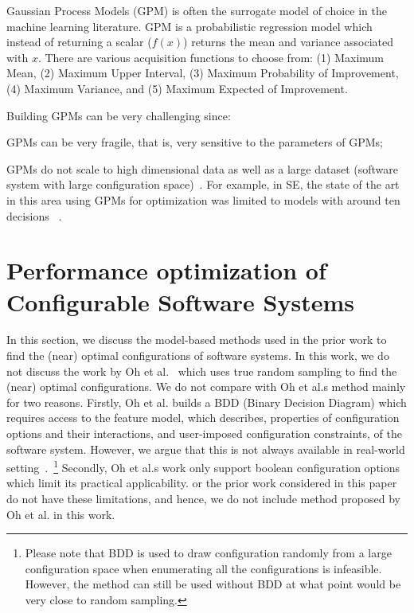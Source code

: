 Gaussian Process Models (GPM) is often the surrogate model of choice in the machine learning literature.
GPM is a probabilistic regression model which instead of returning a scalar ($f(x)$) returns the mean and variance associated with $x$. There are various acquisition functions  to choose from: (1) Maximum Mean, (2) Maximum Upper Interval, (3) Maximum Probability of Improvement, (4) Maximum Variance, and (5) Maximum Expected of Improvement. 

\noindent Building GPMs can be very challenging since:\label{sec:bo_shortcomings}
\bi[leftmargin=*]
\item
GPMs can be very fragile, that is, very sensitive to the parameters of GPMs;
\item
GPMs do not scale to  high dimensional data as well as a large dataset (software system with large configuration space)~\cite{shen2006fast}. For example, in SE, the state of the art in this area using GPMs for  optimization was
limited to models with around ten decisions ~\cite{wang2016bayesian}.
\ei


\section{Performance optimization of Configurable Software Systems}
In this section, we discuss the model-based methods used in the prior work to find the (near) optimal configurations of software systems. In this work, we do not discuss the work by Oh et al.~\cite{oh2017finding} which uses true random sampling to find the (near) optimal configurations. We do not compare \flash with Oh et al.\textquotesingle s method mainly for two reasons. Firstly, Oh et al. builds a BDD (Binary Decision Diagram) which requires access to the feature model, which describes, properties of configuration options and their interactions, and user-imposed configuration constraints,  of the software system. However, we argue that this is not always available in real-world setting~\cite{she2011reverse}.~\footnote{Please note that BDD is used to draw configuration randomly from a large configuration space when enumerating all the configurations is infeasible. However, the method can still be used without BDD at what point would be very close to random sampling.} Secondly, Oh et al.\textquotesingle s work only support boolean configuration options which limit its practical applicability. \flash or the prior work considered in this paper do not have these limitations, and hence, we do not include method proposed by Oh et al. in this work.
